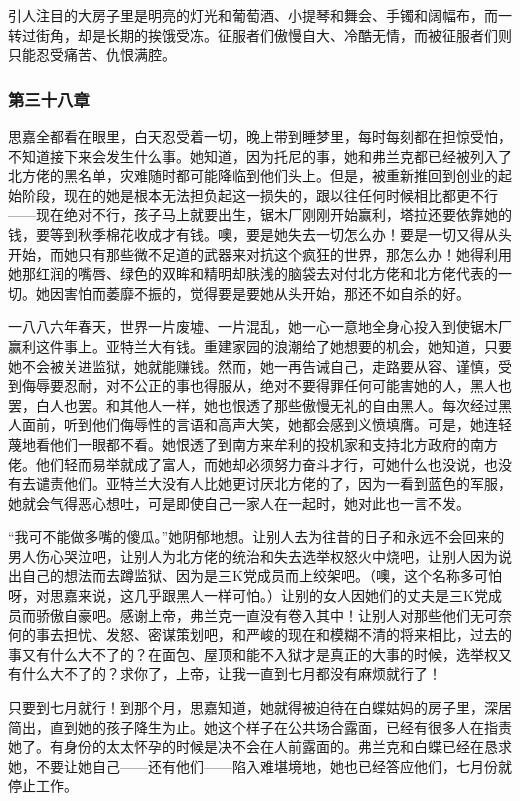 \par 引人注目的大房子里是明亮的灯光和葡萄酒、小提琴和舞会、手镯和阔幅布，而一转过街角，却是长期的挨饿受冻。征服者们傲慢自大、冷酷无情，而被征服者们则只能忍受痛苦、仇恨满腔。

\subsubsection{第三十八章}

\par 思嘉全都看在眼里，白天忍受着一切，晚上带到睡梦里，每时每刻都在担惊受怕，不知道接下来会发生什么事。她知道，因为托尼的事，她和弗兰克都已经被列入了北方佬的黑名单，灾难随时都可能降临到他们头上。但是，被重新推回到创业的起始阶段，现在的她是根本无法担负起这一损失的，跟以往任何时候相比都更不行——现在绝对不行，孩子马上就要出生，锯木厂刚刚开始赢利，塔拉还要依靠她的钱，要等到秋季棉花收成才有钱。噢，要是她失去一切怎么办！要是一切又得从头开始，而她只有那些微不足道的武器来对抗这个疯狂的世界，那怎么办！她得利用她那红润的嘴唇、绿色的双眸和精明却肤浅的脑袋去对付北方佬和北方佬代表的一切。她因害怕而萎靡不振的，觉得要是要她从头开始，那还不如自杀的好。
\par 一八八六年春天，世界一片废墟、一片混乱，她一心一意地全身心投入到使锯木厂赢利这件事上。亚特兰大有钱。重建家园的浪潮给了她想要的机会，她知道，只要她不会被关进监狱，她就能赚钱。然而，她一再告诫自己，走路要从容、谨慎，受到侮辱要忍耐，对不公正的事也得服从，绝对不要得罪任何可能害她的人，黑人也罢，白人也罢。和其他人一样，她也恨透了那些傲慢无礼的自由黑人。每次经过黑人面前，听到他们侮辱性的言语和高声大笑，她都会感到义愤填膺。可是，她连轻蔑地看他们一眼都不看。她恨透了到南方来牟利的投机家和支持北方政府的南方佬。他们轻而易举就成了富人，而她却必须努力奋斗才行，可她什么也没说，也没有去谴责他们。亚特兰大没有人比她更讨厌北方佬的了，因为一看到蓝色的军服，她就会气得恶心想吐，可是即使自己一家人在一起时，她对此也一言不发。
\par “我可不能做多嘴的傻瓜。”她阴郁地想。让别人去为往昔的日子和永远不会回来的男人伤心哭泣吧，让别人为北方佬的统治和失去选举权怒火中烧吧，让别人因为说出自己的想法而去蹲监狱、因为是三K党成员而上绞架吧。（噢，这个名称多可怕呀，对思嘉来说，这几乎跟黑人一样可怕。）让别的女人因她们的丈夫是三K党成员而骄傲自豪吧。感谢上帝，弗兰克一直没有卷入其中！让别人对那些他们无可奈何的事去担忧、发怒、密谋策划吧，和严峻的现在和模糊不清的将来相比，过去的事又有什么大不了的？在面包、屋顶和能不入狱才是真正的大事的时候，选举权又有什么大不了的？求你了，上帝，让我一直到七月都没有麻烦就行了！
\par 只要到七月就行！到那个月，思嘉知道，她就得被迫待在白蝶姑妈的房子里，深居简出，直到她的孩子降生为止。她这个样子在公共场合露面，已经有很多人在指责她了。有身份的太太怀孕的时候是决不会在人前露面的。弗兰克和白蝶已经在恳求她，不要让她自己——还有他们——陷入难堪境地，她也已经答应他们，七月份就停止工作。
